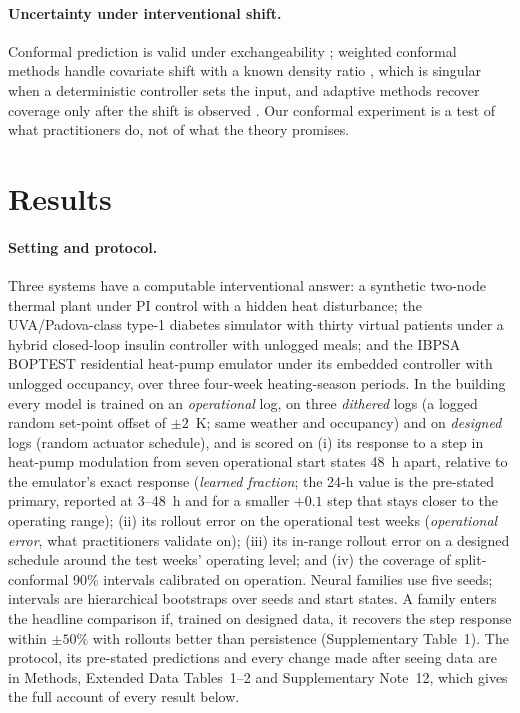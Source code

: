 \documentclass[11pt]{article}
\begin{document}
\paragraph{Uncertainty under interventional shift.} Conformal prediction is valid under exchangeability \citep{vovk2005conformal}; weighted conformal methods handle covariate shift with a known density ratio \citep{tibshirani2019}, which is singular when a deterministic controller sets the input, and adaptive methods recover coverage only after the shift is observed \citep{gibbs2021}. Our conformal experiment is a test of what practitioners do, not of what the theory promises.

\section*{Results}
\paragraph{Setting and protocol.} Three systems have a computable interventional answer: a synthetic two-node thermal plant under PI control with a hidden heat disturbance; the UVA/Padova-class type-1 diabetes simulator with thirty virtual patients under a hybrid closed-loop insulin controller with unlogged meals; and the IBPSA BOPTEST residential heat-pump emulator under its embedded controller with unlogged occupancy, over three four-week heating-season periods. In the building every model is trained on an \emph{operational} log, on three \emph{dithered} logs (a logged random set-point offset of $\pm2$~K; same weather and occupancy) and on \emph{designed} logs (random actuator schedule), and is scored on (i) its response to a step in heat-pump modulation from seven operational start states 48~h apart, relative to the emulator's exact response (\emph{learned fraction}; the 24-h value is the pre-stated primary, reported at 3--48~h and for a smaller $+0.1$ step that stays closer to the operating range); (ii) its rollout error on the operational test weeks (\emph{operational error}, what practitioners validate on); (iii) its in-range rollout error on a designed schedule around the test weeks' operating level; and (iv) the coverage of split-conformal 90\% intervals calibrated on operation. Neural families use five seeds; intervals are hierarchical bootstraps over seeds and start states. A family enters the headline comparison if, trained on designed data, it recovers the step response within $\pm50\%$ with rollouts better than persistence (Supplementary Table~1). The protocol, its pre-stated predictions and every change made after seeing data are in Methods, Extended Data Tables~1--2 and Supplementary Note~12, which gives the full account of every result below.
\end{document}
